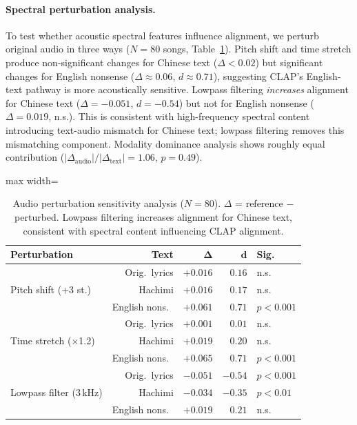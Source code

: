 \documentclass[11pt]{article}
\begin{document}
\paragraph{Spectral perturbation analysis.}
To test whether acoustic spectral features influence alignment, we perturb original audio in three ways ($N{=}80$ songs, Table~\ref{tab:perturbation}). Pitch shift and time stretch produce non-significant changes for Chinese text ($\Delta{<}0.02$) but significant changes for English nonsense ($\Delta{\approx}0.06$, $d{\approx}0.71$), suggesting CLAP's English-text pathway is more acoustically sensitive. Lowpass filtering \emph{increases} alignment for Chinese text ($\Delta{=}{-}0.051$, $d{=}{-}0.54$) but not for English nonsense ($\Delta{=}0.019$, n.s.). This is consistent with high-frequency spectral content introducing text-audio mismatch for Chinese text; lowpass filtering removes this mismatching component. Modality dominance analysis shows roughly equal contribution ($|\Delta_{\text{audio}}|/|\Delta_{\text{text}}|{=}1.06$, $p{=}0.49$).

\begin{table}[!t]
\centering
\caption{Audio perturbation sensitivity analysis ($N{=}80$). $\Delta$ = reference $-$ perturbed. Lowpass filtering increases alignment for Chinese text, consistent with spectral content influencing CLAP alignment.}
\label{tab:perturbation}
\scriptsize
\begin{adjustbox}{max width=\columnwidth}
\begin{tabular}{l r r r l}
\toprule
\textbf{Perturbation} & \textbf{Text} & $\boldsymbol{\Delta}$ & $\boldsymbol{d}$ & \textbf{Sig.} \\
\midrule
\multirow{3}{*}{Pitch shift (+3 st.)}
  & Orig.\ lyrics & $+0.016$ & $0.16$ & n.s. \\
  & Hachimi & $+0.016$ & $0.17$ & n.s. \\
  & English nons.\ & $+0.061$ & $0.71$ & $p{<}0.001$ \\
\midrule
\multirow{3}{*}{Time stretch ($\times$1.2)}
  & Orig.\ lyrics & $+0.001$ & $0.01$ & n.s. \\
  & Hachimi & $+0.019$ & $0.20$ & n.s. \\
  & English nons.\ & $+0.065$ & $0.71$ & $p{<}0.001$ \\
\midrule
\multirow{3}{*}{Lowpass filter (3\,kHz)}
  & Orig.\ lyrics & $-0.051$ & $-0.54$ & $p{<}0.001$ \\
  & Hachimi & $-0.034$ & $-0.35$ & $p{<}0.01$ \\
  & English nons.\ & $+0.019$ & $0.21$ & n.s. \\
\bottomrule
\end{tabular}
\end{adjustbox}
\end{table}
\end{document}
